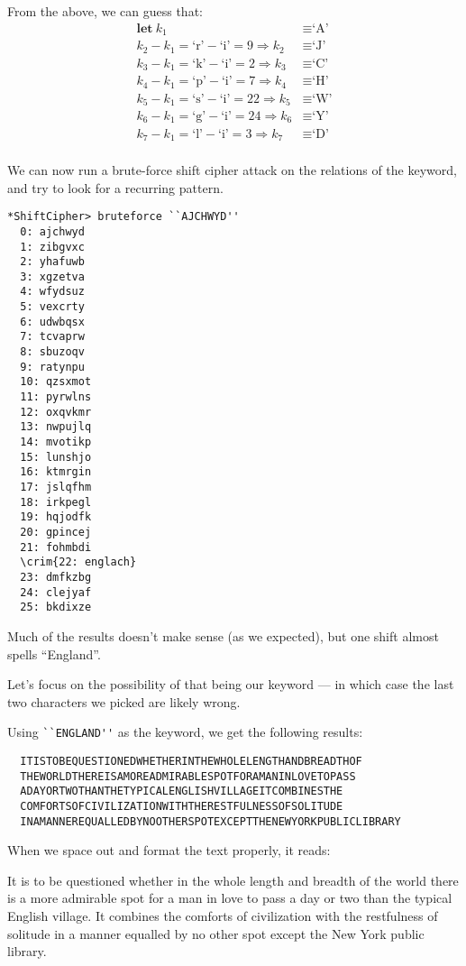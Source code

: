 \begin{Answer}
From the above, we can guess that:
\begin{align*}
  \mathbf{let\ } k_{1} &\equiv \text{`A'} \\
  k_{2} - k_{1} = \text{`r'} - \text{`i'} = 9 \Rightarrow k_{2} &\equiv \text{`J'}\\
  k_3 - k_1 = \text{`k'} - \text{`i'} = 2 \Rightarrow k_{3} &\equiv \text{`C'}\\
  k_4 - k_1 = \text{`p'} - \text{`i'} = 7 \Rightarrow k_{4} &\equiv \text{`H'}\\
  k_5 - k_1 = \text{`s'} - \text{`i'} = 22 \Rightarrow k_{5} &\equiv \text{`W'}\\
  k_6 - k_1 = \text{`g'} - \text{`i'} = 24 \Rightarrow k_{6} &\equiv \text{`Y'}\\
  k_7 - k_1 = \text{`l'} - \text{`i'} = 3 \Rightarrow k_{7} &\equiv \text{`D'}\\
\end{align*}

We can now run a brute-force shift cipher attack on the relations of the keyword,
and try to look for a recurring pattern.
\begin{multicols*}{2}
\begin{Verbatim}[commandchars=\\\{\}]
  *ShiftCipher> bruteforce ``AJCHWYD''
  0: ajchwyd
  1: zibgvxc
  2: yhafuwb
  3: xgzetva
  4: wfydsuz
  5: vexcrty
  6: udwbqsx
  7: tcvaprw
  8: sbuzoqv
  9: ratynpu
  10: qzsxmot
  11: pyrwlns
  12: oxqvkmr
  13: nwpujlq
  14: mvotikp
  15: lunshjo
  16: ktmrgin
  17: jslqfhm
  18: irkpegl
  19: hqjodfk
  20: gpincej
  21: fohmbdi
  \crim{22: englach}
  23: dmfkzbg
  24: clejyaf
  25: bkdixze
\end{Verbatim}
\end{multicols*}

\noindent
Much of the results doesn't make sense (as we expected), but one shift almost spells ``England''.

\noindent
Let's focus on the possibility of that being our keyword
--- in which case the last two characters we picked are likely wrong.

Using \Verb#``ENGLAND''# as the keyword, we get the following results:
\color{zaffre}
\begin{Verbatim}
  ITISTOBEQUESTIONEDWHETHERINTHEWHOLELENGTHANDBREADTHOF
  THEWORLDTHEREISAMOREADMIRABLESPOTFORAMANINLOVETOPASS
  ADAYORTWOTHANTHETYPICALENGLISHVILLAGEITCOMBINESTHE
  COMFORTSOFCIVILIZATIONWITHTHERESTFULNESSOFSOLITUDE
  INAMANNEREQUALLEDBYNOOTHERSPOTEXCEPTTHENEWYORKPUBLICLIBRARY
\end{Verbatim}
\color{black}

\noindent
When we space out and format the text properly, it reads:

\bigskip
\noindent
\color{teal}
It is to be questioned whether in the whole length and breadth
of the world there is a more admirable spot for a man in love
to pass a day or two than the typical English village.
It combines the comforts of civilization with the restfulness
of solitude in a manner equalled by no other spot except
the New York public library.
\color{black}
\end{Answer}
